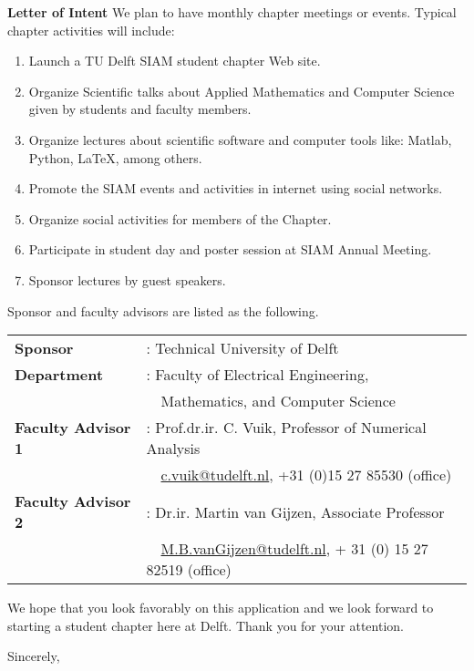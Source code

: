 \documentclass[letterpaper,12pt]{letter}
\begin{document}
\begin{letter}{\textbf{Letter of Intent}}
We plan to have monthly chapter meetings or events. Typical chapter activities will include:
\begin{enumerate}
\item Launch a TU Delft SIAM student chapter Web site.
\item Organize Scientific talks about Applied Mathematics and Computer Science given by students and faculty members.
\item Organize lectures about scientific software and computer tools like: Matlab, Python, \LaTeX, among others. 
\item Promote the SIAM events and activities in internet using social networks.
\item Organize social activities for members of the Chapter.
\item Participate in student day and poster session at SIAM Annual Meeting.
\item Sponsor lectures by guest speakers.
\end{enumerate}
\newpage
Sponsor and faculty advisors are listed as the following.

\begin{tabular}{ll}
\textbf{Sponsor} &: Technical University of Delft \\
\textbf{Department} &: Faculty of Electrical Engineering, \\
&\ \ Mathematics, and Computer Science \\
\textbf{Faculty Advisor 1} &: Prof.dr.ir. C. Vuik, Professor of Numerical Analysis \\
&\ \ \href{C.Vuik@tudelft.nl}{c.vuik@tudelft.nl}, +31 (0)15 27 85530 (office) \\
\textbf{Faculty Advisor 2} &: Dr.ir. Martin van Gijzen, Associate Professor \\
&\ \ \href{M.B.vanGijzen@tudelft.nl}{M.B.vanGijzen@tudelft.nl}, + 31 (0) 15 27 82519 (office) \\
\end{tabular}

\bigskip

We hope that you look favorably on this application and we look forward to starting a student chapter here at Delft. Thank you for your attention.

\closing{Sincerely,}


\end{letter}
\end{document}
